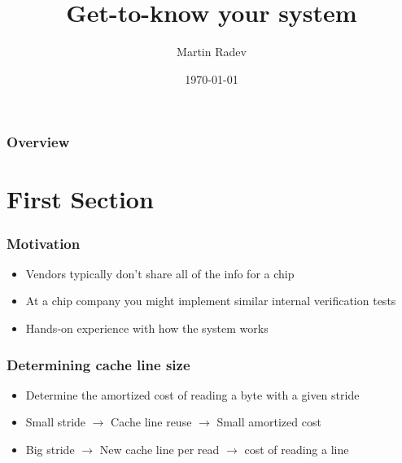 \documentclass{beamer}
\title[Get-to-know your system]{Get-to-know your system} %
\author{Martin Radev} %
\institute[Microprocessors18] %
{
\medskip
\textit{} %
}
\date{\today} %
\begin{document}
\begin{frame}
\titlepage %
\end{frame}

\begin{frame}
\frametitle{Overview} %
\tableofcontents %
\end{frame}


\section{First Section} %


\begin{frame}
\frametitle{Motivation}
\begin{itemize}
\item Vendors typically don't share all of the info for a chip
\item At a chip company you might implement similar internal verification tests
\item Hands-on experience with how the system works
\end{itemize}
\end{frame}

\begin{frame}
\frametitle{Determining cache line size}
\begin{itemize}
\item Determine the amortized cost of reading a byte with a given stride
\item Small stride $\rightarrow$ Cache line reuse $\rightarrow$ Small amortized cost
\item Big stride $\rightarrow$ New cache line per read $\rightarrow$ cost of reading a line
\end{itemize}
\end{frame}
\end{document}

